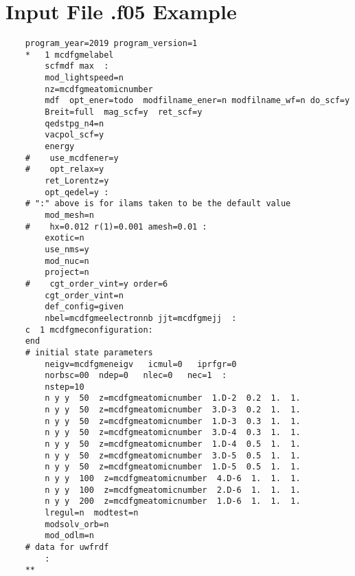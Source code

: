 
%


\chapter{Input File .f05 Example}\label{an:second_cycle}

\begin{lstlisting}
    program_year=2019 program_version=1
    *   1 mcdfgmelabel
        scfmdf max  :
        mod_lightspeed=n
        nz=mcdfgmeatomicnumber
        mdf  opt_ener=todo  modfilname_ener=n modfilname_wf=n do_scf=y     
        Breit=full  mag_scf=y  ret_scf=y
        qedstpg_n4=n
        vacpol_scf=y
        energy
    #    use_mcdfener=y
    #    opt_relax=y                                                         
        ret_Lorentz=y
        opt_qedel=y :
    # ":" above is for ilams taken to be the default value
        mod_mesh=n
    #    hx=0.012 r(1)=0.001 amesh=0.01 :
        exotic=n
        use_nms=y
        mod_nuc=n
        project=n
    #    cgt_order_vint=y order=6
        cgt_order_vint=n
        def_config=given
        nbel=mcdfgmeelectronnb jjt=mcdfgmejj  :
    c  1 mcdfgmeconfiguration:
    end
    # initial state parameters
        neigv=mcdfgmeneigv   icmul=0   iprfgr=0
        norbsc=00  ndep=0   nlec=0   nec=1  :
        nstep=10
        n y y  50  z=mcdfgmeatomicnumber  1.D-2  0.2  1.  1.
        n y y  50  z=mcdfgmeatomicnumber  3.D-3  0.2  1.  1.
        n y y  50  z=mcdfgmeatomicnumber  1.D-3  0.3  1.  1.
        n y y  50  z=mcdfgmeatomicnumber  3.D-4  0.3  1.  1.
        n y y  50  z=mcdfgmeatomicnumber  1.D-4  0.5  1.  1.
        n y y  50  z=mcdfgmeatomicnumber  3.D-5  0.5  1.  1.
        n y y  50  z=mcdfgmeatomicnumber  1.D-5  0.5  1.  1.
        n y y  100  z=mcdfgmeatomicnumber  4.D-6  1.  1.  1.
        n y y  100  z=mcdfgmeatomicnumber  2.D-6  1.  1.  1.
        n y y  200  z=mcdfgmeatomicnumber  1.D-6  1.  1.  1.
        lregul=n  modtest=n
        modsolv_orb=n
        mod_odlm=n
    # data for uwfrdf
        :
    **    
\end{lstlisting}